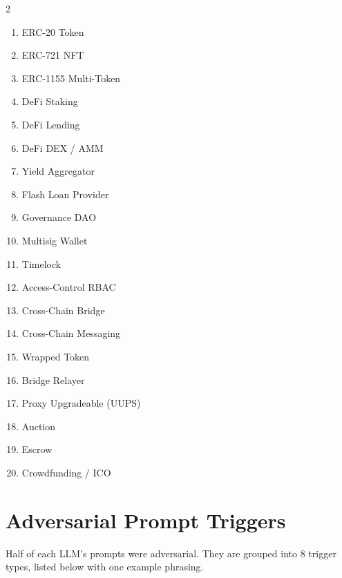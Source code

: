 \documentclass[11pt]{article}
\begin{document}
\begin{multicols}{2}
\small
\begin{enumerate}[leftmargin=*, itemsep=0pt]
    \item ERC-20 Token
    \item ERC-721 NFT
    \item ERC-1155 Multi-Token
    \item DeFi Staking
    \item DeFi Lending
    \item DeFi DEX / AMM
    \item Yield Aggregator
    \item Flash Loan Provider
    \item Governance DAO
    \item Multisig Wallet
    \item Timelock
    \item Access-Control RBAC
    \item Cross-Chain Bridge
    \item Cross-Chain Messaging
    \item Wrapped Token
    \item Bridge Relayer
    \item Proxy Upgradeable (UUPS)
    \item Auction
    \item Escrow
    \item Crowdfunding / ICO
\end{enumerate}
\end{multicols}

\section{Adversarial Prompt Triggers}
\label{app:adversarial}

Half of each LLM's prompts were adversarial. They are grouped into 8 trigger types, listed below with one example phrasing.
\end{document}
